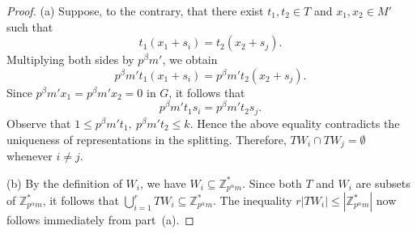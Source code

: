 \documentclass[10pt,a4paper]{amsart}
\begin{document}
\begin{proof}
	(a) Suppose, to the contrary, that there exist \(t_1,t_2\in T\) and \(x_1,x_2\in M'\) such that
	\[
	t_1(x_1+s_i)=t_2(x_2+s_j).
	\]
	Multiplying both sides by \(p^\beta m'\), we obtain
	\[
	p^\beta m' t_1(x_1+s_i)
	=
	p^\beta m' t_2(x_2+s_j).
	\]
	Since \(p^\beta m' x_1=p^\beta m' x_2=0\) in \(G\), it follows that
	\[
	p^\beta m' t_1 s_i
	=
	p^\beta m' t_2 s_j.
	\]
	Observe that $1\le p^\beta m' t_1,\ p^\beta m' t_2 \le k.$
	Hence the above equality contradicts the uniqueness of representations in the splitting. Therefore, $TW_i \cap TW_j=\emptyset$
	whenever \(i\ne j\).
	
	(b) By the definition of \(W_i\), we have $W_i\subseteq \mathbb{Z}_{p^\alpha m}^{*}.$
	Since both \(T\) and \(W_i\) are subsets of \(\mathbb{Z}_{p^\alpha m}^{*}\), it follows that $\bigcup_{i=1}^{r} TW_i
	\subseteq\mathbb{Z}_{p^\alpha m}^{*}.$
	The inequality $r|TW_i|\le|\mathbb{Z}_{p^\alpha m}^{*}|$ now follows immediately from part~(a).
\end{proof}
\end{document}
